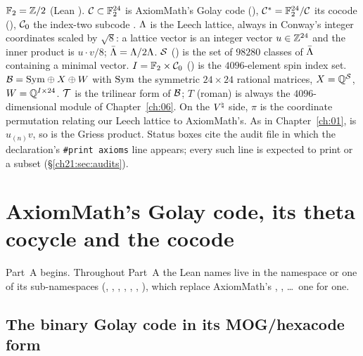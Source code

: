 \begin{remark}[Notation]\label{ch21:rem:notation}
$\mathbb{F}_2={\mathbb{Z}}/2$ (Lean ).  $\mathcal{C}\subset\mathbb{F}_2^{24}$ is AxiomMath's Golay code
(), $\mathcal{C}^*=\mathbb{F}_2^{24}/\mathcal{C}$ its cocode (), $\mathcal{C}_0$ the
index-two subcode .  ${\Lambda}$ is the Leech lattice, always in Conway's integer coordinates
scaled by $\sqrt8$: a lattice vector is an integer vector $u\in{\mathbb{Z}}^{24}$ and the inner product is
$u\cdot v/8$; $\bar{\Lambda}={\Lambda}/2{\Lambda}$.  $\mathcal{S}$ () is the set of $98280$ classes of
$\bar{\Lambda}$ containing a minimal vector.  $I=\mathbb{F}_2\times\mathcal{C}_0$ () is the
$4096$-element spin index set.  $\mathcal{B}=\mathrm{Sym}\oplus X\oplus W$ with $\mathrm{Sym}$ the symmetric
$24\times24$ rational matrices, $X={\mathbb{Q}}^{\mathcal{S}}$, $W={\mathbb{Q}}^{I\times24}$.  $\mathcal{T}$ is the trilinear form of
$\mathcal{B}$; $T$ (roman) is always the $4096$-dimensional module of Chapter~\ref{ch:06}.  On the ${V^{\natural}}$
side, $\pi$ is the coordinate permutation  relating our Leech lattice to AxiomMath's.  As in
Chapter~\ref{ch:01},  is $u_{(n)}v$, so  is the Griess
product.  Status boxes cite the audit file in which the declaration's \texttt{\#print axioms} line
appears; every such line is expected to print  or a subset
(\S\ref{ch21:sec:audits}).
\end{remark}

\section{AxiomMath's Golay code, its theta cocycle and the cocode}\label{ch21:sec:golay}

Part~A begins.  Throughout Part~A the Lean names live in the namespace
 or one of its sub-namespaces (, ,
, , , , ),
which replace AxiomMath's , , \dots\ one for one.

\subsection{The binary Golay code in its MOG/hexacode form}

